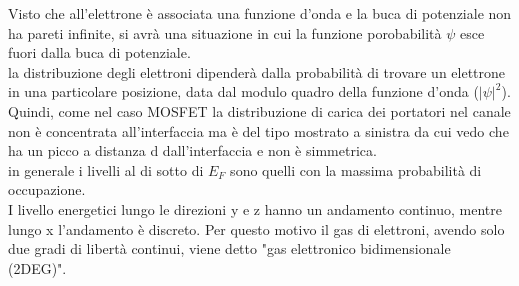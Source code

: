 \begin{center}
    \label{fig:enter-label}
\end{center}

%
Visto che all'elettrone è associata una funzione d'onda e la buca di potenziale non ha pareti infinite, si avrà una situazione in cui la funzione porobabilità $\psi$ esce fuori dalla buca di potenziale.\\
la distribuzione degli elettroni dipenderà dalla probabilità di trovare un elettrone in una particolare posizione, data dal modulo quadro della funzione d'onda ($|\psi|^2$).\\
Quindi, come nel caso MOSFET la distribuzione di carica dei portatori nel canale non è concentrata all'interfaccia ma è del tipo mostrato a sinistra da cui vedo che ha un picco a distanza d dall'interfaccia e non è simmetrica.\\
in generale i livelli al di sotto di $E_F$ sono quelli con la massima probabilità di occupazione.\\
I livello energetici lungo le direzioni y e z hanno un andamento continuo, mentre lungo x l'andamento è discreto. Per questo motivo il gas di elettroni, avendo solo due gradi di libertà continui, viene detto "gas elettronico bidimensionale (2DEG)".\\

